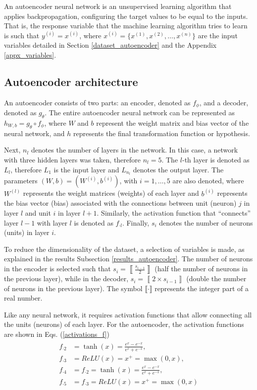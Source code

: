 \documentclass{iosart2c}
\begin{document}
An autoencoder neural network is an unsupervised learning algorithm that applies backpropagation, configuring the target values to be equal to the inputs. That is, the response variable that the machine learning algorithm tries to learn is such that $y^{(i)} = x^{(i)} $, where $x^{(i)} = \{x^{(1)}, x^{(2)}, \ldots, x^{(n)} \} $ are the input variables detailed in Section \ref{dataset_autoencoder} and the Appendix \ref{appx_variables}.\\

\subsection{Autoencoder architecture}\label{autoencoder_architecture}

An autoencoder consists of two parts: an encoder, denoted as $f_{\phi}$, and a decoder, denoted as $g_{\theta}$. The entire autoencoder neural network can be represented as $h_{W, b} = g_\theta \circ f_\phi$, where $W$ and $b$ represent the weight matrix and bias vector of the neural network, and $h$ represents the final transformation function or hypothesis.

Next, $n_l$ denotes the number of layers in the network. In this case, a network with three hidden layers was taken, therefore $n_l=5$. The $l$-th layer is denoted as $L_l$, therefore $L_1$ is the input layer and $L_{n_l}$ denotes the output layer. The parameters $(W,b)=(W^{(i)},b^{(i)})$, with $i=1,\ldots,5$ are also denoted, where $W^{(l)}$ represents the weight matrices (weights) of each layer and $b^{(i)}$ represents the bias vector (bias) associated with the connections between unit (neuron) $j$ in layer $l$ and unit $i$ in layer $l+1$. Similarly, the activation function that ``connects'' layer $l-1$ with layer $l$ is denoted as $f_{\cdot l}$. Finally, $s_i$ denotes the number of neurons (units) in layer $i$.
 
To reduce the dimensionality of the dataset, a selection of variables is made, as explained in the results Subsection \ref{results_autoencoder}. The number of neurons in the encoder is selected such that $s_i=\left\llbracket\frac{s_{i-1}}{2}\right\rrbracket$ (half the number of neurons in the previous layer), while in the decoder, $s_i=\left\llbracket 2\times s_{i-1} \right\rrbracket$ (double the number of neurons in the previous layer). The symbol $\llbracket \cdot \rrbracket$ represents the integer part of a real number.

Like any neural network, it requires activation functions that allow connecting all the units (neurons) of each layer. For the autoencoder, the  activation functions are shown in Eqs. (\ref{activations_f})
\begin{eqnarray}
\begin{aligned} \label{activations_f}
f_{\cdot 2} &= \tanh(x)=\frac{e^{x}-e^{-x}}{ e^{x}+e^{-x}},  \\
f_{\cdot 3} &= ReLU(x) = x^+ = \max(0, x), \\
f_{\cdot 4} &= f_{\cdot 2} = \tanh(x)=\frac{e^{x}-e^{-x}}{ e^{x}+e^{-x}},  \\
f_{\cdot 5} &= f_{\cdot 3} = ReLU(x) = x^+ = \max(0, x)
\end{aligned}
\end{eqnarray}
\end{document}
